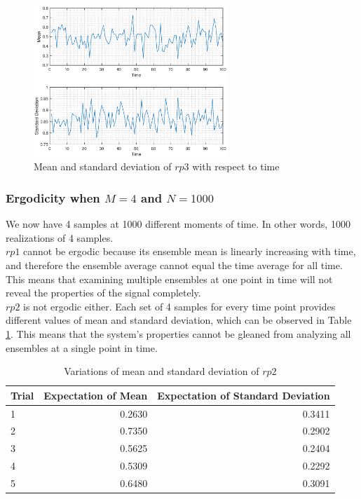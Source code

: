 \documentclass{article}
\begin{document}
\begin{figure}[h!]
\centering
\includegraphics[width=0.65\textwidth]{ergodic_rp3}
\caption{\label{fig:ergodic_rp3} Mean and standard deviation of $rp3$ with respect to time}
\end{figure}

\pagebreak
\subsubsection{Ergodicity when $M=4$ and $N=1000$}

We now have 4 samples at 1000 different moments of time. In other words, 1000 realizations of 4 samples.\\

$rp1$ cannot be ergodic because its ensemble mean is linearly increasing with time, and therefore the ensemble average cannot equal the time average for all time. This means that examining multiple ensembles at one point in time will not reveal the properties of the signal completely.\\

$rp2$ is not ergodic either. Each set of 4 samples for every time point provides different values of mean and standard deviation, which can be observed in Table \ref{fig:rp2}. This means that the system's properties cannot be gleaned from analyzing all ensembles at a single point in time.\\

\begin{table}[h!]
\centering
\begin{tabular}{|l|r|r|} \hline

Trial	&Expectation of Mean	&Expectation of Standard Deviation \\ \hline
1		&0.2630					&0.3411	\\ \hline
2		&0.7350					&0.2902	\\ \hline
3		&0.5625					&0.2404	\\ \hline
4		&0.5309					&0.2292 \\ \hline
5		&0.6480					&0.3091	\\ \hline
\end{tabular}
\caption{\label{fig:rp2} Variations of mean and standard deviation of $rp2$}
\end{table}
\end{document}
